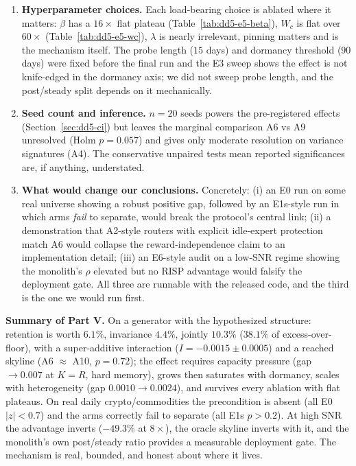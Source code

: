 \documentclass[11pt,a4paper]{article}
\theoremstyle{definition}
\theoremstyle{plain}
\newcommand{\R}{\mathbb{R}}
\newcommand{\E}{\mathbb{E}}
\newcommand{\Var}{\mathrm{Var}}
\newcommand{\nm}{\textsc{RISP}}
\begin{document}
\begin{enumerate}
easy.
\item \textbf{Hyperparameter choices.} Each load-bearing choice is ablated
where it matters: $\beta$ has a $16\times$ flat plateau
(Table~\ref{tab:dd5-e5-beta}), $W_c$ is flat over $60\times$
(Table~\ref{tab:dd5-e5-wc}), $\lambda$ is nearly irrelevant, pinning
matters and is the mechanism itself. The probe length ($15$ days) and
dormancy threshold ($90$ days) were fixed before the final run and the E3
sweep shows the effect is not knife-edged in the dormancy axis; we did not
sweep probe length, and the post/steady split depends on it mechanically.
\item \textbf{Seed count and inference.} $n = 20$ seeds powers the
pre-registered effects (Section~\ref{sec:dd5-ci}) but leaves the marginal
comparison A6 vs A9 unresolved (Holm $p = 0.057$) and gives only moderate
resolution on variance signatures (A4). The conservative unpaired tests
mean reported significances are, if anything, understated.
\item \textbf{What would change our conclusions.} Concretely: (i) an E0 run
on some real universe showing a robust positive gap, followed by an E1s-style
run in which arms \emph{fail} to separate, would break the protocol's
central link; (ii) a demonstration that A2-style routers with explicit
idle-expert protection match A6 would collapse the
reward-independence claim to an implementation detail; (iii) an E6-style
audit on a low-SNR regime showing the monolith's $\rho$ elevated but no
RISP advantage would falsify the deployment gate. All three are
runnable with the released code, and the third is the one we would run
first.
\end{enumerate}

\begin{keypoint}
\textbf{Summary of Part V.} On a generator with the hypothesized structure:
retention is worth $6.1\%$, invariance $4.4\%$, jointly $10.3\%$
($38.1\%$ of excess-over-floor), with a super-additive interaction
($I = -0.0015 \pm 0.0005$) and a reached skyline (A6 $\approx$ A10,
$p = 0.72$); the effect requires capacity pressure (gap $\to 0.007$ at
$K = R$, hard memory), grows then saturates with dormancy, scales with
heterogeneity (gap $0.0010 \to 0.0024$), and survives every ablation with
flat plateaus. On real daily crypto/commodities the precondition is absent
(all E0 $|z| < 0.7$) and the arms correctly fail to separate (all
E1s $p > 0.2$). At high SNR the advantage inverts ($-49.3\%$ at $8\times$),
the oracle skyline inverts with it, and the monolith's own post/steady
ratio provides a measurable deployment gate. The mechanism is real,
bounded, and honest about where it lives.
\end{keypoint}
\end{document}
